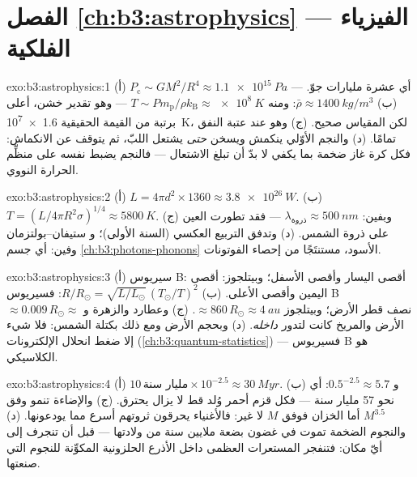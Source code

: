 \section*{الفصل \ref{ch:b3:astrophysics} --- الفيزياء الفلكية}

\begin{solution}{exo:b3:astrophysics:1}
(أ) $P_{\text{c}} \sim GM^2/R^4 \approx \qty{1.1e15}{Pa}$ --- أي عشرة
مليارات جوّ. (ب) $\bar\rho \approx \qty{1400}{kg/m^3}$: ومنه
$T \sim P m_{\text{p}}/\rho k_{\text{B}} \approx \qty{e8}{K}$ ---
وهو تقدير خشن، أعلى برتبة من القيمة الحقيقية \qty{1.6e7}{K}، لكن المقياس
صحيح. (ج) وهو عند عتبة النفق تمامًا. (د) والنجم الأوّلي
ينكمش ويسخن \emph{حتى} يشتعل اللبّ، ثم يتوقف عن
الانكماش: فكل كرة غاز ضخمة بما يكفي لا بدّ أن تبلغ الاشتعال
--- فالنجم يضبط نفسه على منظِّم الحرارة النووي.
\end{solution}

\begin{solution}{exo:b3:astrophysics:2}
(أ) $L = 4\pi d^2\times1360 \approx \qty{3.8e26}{W}$. (ب) $T =
(L/4\pi R^2\sigma)^{1/4} \approx \qty{5800}{K}$. (ج) وبفين:
$\lambda_{\text{ذروة}} \approx \qty{500}{nm}$ --- فقد تطورت العين
على ذروة الشمس. (د) وتدفق التربيع العكسي (السنة الأولى)؛ و
ستيفان--بولتزمان وفين: أي جسم \cref{ch:b3:photons-phonons}
الأسود، مستنتَجًا من إحصاء الفوتونات.
\end{solution}

\begin{solution}{exo:b3:astrophysics:3}
(أ) سيريوس B: أقصى اليسار وأقصى الأسفل؛ وبيتلجوز: أقصى اليمين وأقصى الأعلى.
(ب) $R/R_\odot = \sqrt{L/L_\odot}\,(T_\odot/T)^2$: فسيريوس B
$\approx 0.009\,R_\odot \approx$ نصف قطر الأرض؛ وبيتلجوز
$\approx 860\,R_\odot \approx \qty{4}{au}$. (ج) وعطارد والزهرة و
الأرض والمريخ كانت لتدور \emph{داخله}. (د) وبحجم الأرض ومع ذلك
بكتلة الشمس: فلا شيء إلا ضغط انحلال الإلكترونات
(\cref{ch:b3:quantum-statistics}) --- فسيريوس B هو  الكلاسيكي.
\end{solution}

\begin{solution}{exo:b3:astrophysics:4}
(أ) $10\,\text{مليار سنة}\times10^{-2.5} \approx \qty{30}{Myr}$. (ب)
و $0.5^{-2.5} \approx 5.7$: أي نحو 57 مليار سنة --- فكل قزم
أحمر وُلد قط لا يزال يحترق. (ج) والإضاءة تنمو وفق
$M^{3.5}$ أما الخزان فوفق $M$ لا غير: فالأغنياء يحرقون ثروتهم
أسرع مما يودعونها. (د) والنجوم الضخمة تموت في غضون بضعة
ملايين سنة من ولادتها --- قبل أن تنجرف إلى أيّ مكان: فتنفجر المستعرات العظمى
داخل الأذرع الحلزونية المكوِّنة للنجوم التي صنعتها.
\end{solution}

